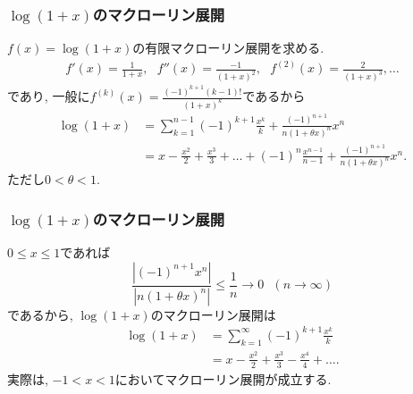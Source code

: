 \begin{frame}
\frametitle{$\log(1+x)$のマクローリン展開}

$f(x)=\log(1+x)$の有限マクローリン展開を求める. 
\begin{align*}
f'(x)=\frac{1}{1+x}, \ \ \  f''(x)=\frac{-1}{(1+x)^2}, \ \ \  f^{(2)}(x)=\frac{2}{(1+x)^3}, \dots
\end{align*}
であり, 一般に$f^{(k)}(x)=\frac{(-1)^{k+1}(k-1)!}{(1+x)^{k}}$であるから
\begin{align*}
\log(1+x) &= \sum_{k=1}^{n-1}(-1)^{k+1}\frac{x^k}{k}+\frac{(-1)^{n+1}}{n(1+\theta x)^{n}}x^n \\
& = x-\frac{x^2}{2}+\frac{x^3}{3}+ \dots +(-1)^{n}\frac{x^{n-1}}{n-1}+\frac{(-1)^{n+1}}{n(1+\theta x)^{n}}x^n. 
\end{align*}
ただし$0<\theta < 1$. 

\end{frame}






\begin{frame}
\frametitle{$\log(1+x)$のマクローリン展開}

$0\le x\le 1$であれば
$$
\frac{|(-1)^{n+1}x^n|}{|n(1+\theta x)^{n}|} \le \frac{1}{n} \to 0 \ \ \ (n\to \infty)
$$
であるから, $\log(1+x)$のマクローリン展開は
\begin{align*}
\log(1+x) & =  \sum_{k=1}^{\infty}(-1)^{k+1}\frac{x^k}{k} \\
& =  x-\frac{x^2}{2}+\frac{x^3}{3} - \frac{x^4}{4}+\dots.
\end{align*}
実際は, $-1<x<1$においてマクローリン展開が成立する. 

\end{frame}









